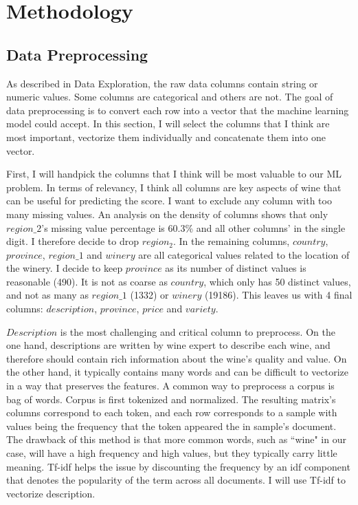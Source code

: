 \documentclass{article}
\begin{document}
\section{Methodology}
\subsection{Data Preprocessing}
As described in Data Exploration, the raw data columns contain string or numeric values. Some columns are categorical and others are not. The goal of data preprocessing is to convert each row into a vector that the machine learning model could accept. In this section, I will select the columns that I think are most important, vectorize them individually and concatenate them into one vector.

First, I will handpick the columns that I think will be most valuable to our ML problem. In terms of relevancy, I think all columns are key aspects of wine that can be useful for predicting the score. I want to exclude any column with too many missing values. An analysis on the density of columns shows that only $region\_2$'s missing value percentage is 60.3\% and all other columns' in the single digit. I therefore decide to drop $region_2$. In the remaining columns, $country$, $province$, $region\_1$ and $winery$ are all categorical values related to the location of the winery. I decide to keep $province$ as its number of distinct values is reasonable (490). It is not as coarse as $country$, which only has 50 distinct values, and not as many as $region\_1$ (1332) or $winery$ (19186). This leaves us with 4 final columns: $description$, $province$, $price$ and $variety$.

$Description$ is the most challenging and critical column to preprocess. On the one hand, descriptions are written by wine expert to describe each wine, and therefore should contain rich information about the wine's quality and value. On the other hand, it typically contains many words and can be difficult to vectorize in a way that preserves the features. A common way to preprocess a corpus is bag of words. Corpus is first tokenized and normalized. The resulting matrix's columns correspond to each token, and each row corresponds to a sample with values being the frequency that the token appeared the in sample's document. The drawback of this method is that more common words, such as ``wine" in our case, will have a high frequency and high values, but they typically carry little meaning. Tf-idf helps the issue by discounting the frequency by an idf component that denotes the popularity of the term across all documents. I will use Tf-idf to vectorize description.
\end{document}

